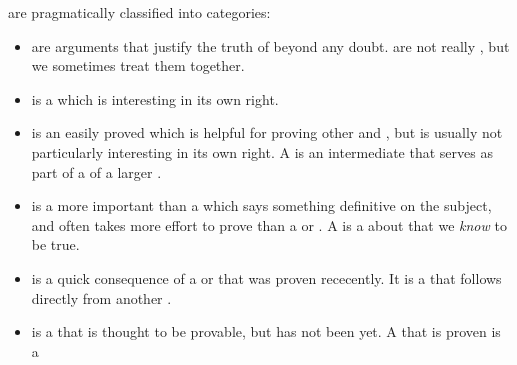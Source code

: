  are pragmatically classified into categories:
\begin{itemize}
    \item {} are arguments that justify the truth of  beyond any doubt.  are not really , but we sometimes treat them together.
    \item {} is a  which is interesting in its own right.
    \item {} is an easily proved  which is helpful for proving other  and , but is usually not particularly interesting in its own right. A  is an intermediate  that serves as part of a  of a larger .
    \item {} is a more important  than a  which says something definitive on the subject, and often takes more effort to prove than a  or . A  is a  about  that we \textit{know} to be true.
    \item {} is a quick consequence of a  or  that was proven rececently. It is a  that follows directly from another .
    \item {} is a  that is thought to be provable, but has not been yet. A  that is proven is a 
\end{itemize}

